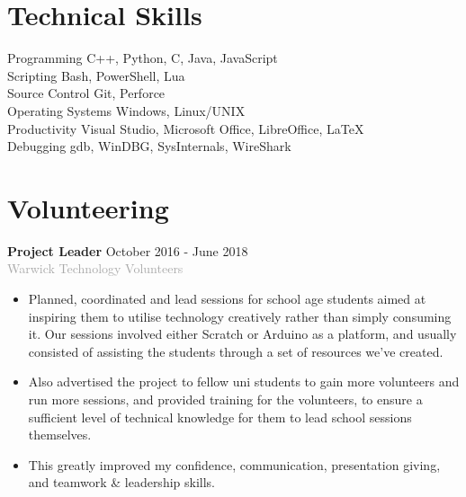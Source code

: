 \documentclass[11pt]{article}
\newcommand{\dash}{\item[-]}
\newcommand{\linesep}{\noindent\makebox[\linewidth]{\rule{\linewidth}{0.2pt}}}
\begin{document}
  \section*{Technical Skills}
\hspace*{1in} Programming \hfill C++, Python, C, Java, JavaScript \\
\hspace*{1in} Scripting \hfill Bash, PowerShell, Lua \\
\hspace*{1in} Source Control \hspace{1in} Git, Perforce \\
\hspace*{1in} Operating Systems \hspace{1in} Windows, Linux/UNIX \\
\hspace*{1in} Productivity \hspace{1in} Visual Studio, Microsoft Office, LibreOffice, LaTeX \\
\hspace*{1in} Debugging \hspace{1in} gdb, WinDBG, SysInternals, WireShark
 
  \linesep

  \section*{Volunteering}
\textbf{Project Leader} \hfill October 2016 - June 2018 \\
\textcolor{darkgray}{Warwick Technology Volunteers}
   \begin{itemize}
    \dash Planned, coordinated and lead sessions for school age students aimed at inspiring them to utilise technology creatively rather than simply consuming it. Our sessions involved either Scratch or Arduino as a platform, and usually consisted of assisting the students through a set of resources we’ve created.
	\dash Also advertised the project to fellow uni students to gain more volunteers and run more sessions, and provided training for the volunteers, to ensure a sufficient level of technical knowledge for them to lead school sessions themselves.
	\dash This greatly improved my confidence, communication, presentation giving, and teamwork \& leadership skills.
   \end{itemize}

  \linesep
\end{document}
